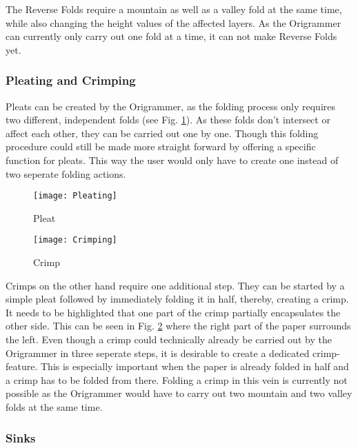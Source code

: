 \noindent The Reverse Folds require a mountain as well as a valley fold at the same time, while also changing the height values of the affected layers. As the Origrammer can currently only carry out one fold at a time, it can not make Reverse Folds yet.

\subsubsection*{Pleating and Crimping}

Pleats can be created by the Origrammer, as the folding process only requires two different, independent folds (see Fig. \ref{fig:pleating}). As these folds don't intersect or affect each other, they can be carried out one by one. Though this folding procedure could still be made more straight forward by offering a specific function for pleats. This way the user would only have to create one instead of two seperate folding actions.
\begin{figure*}[htbp]
	\centering
	\begin{subfigure}{0.49\textwidth}
		\texttt{[image: Pleating]}
		\caption{Pleat}
		\label{fig:pleating}
	\end{subfigure}
	\begin{subfigure}{0.49\textwidth}
		\texttt{[image: Crimping]}
		\caption{Crimp}
		\label{fig:crimping}
	\end{subfigure}
	\caption{Pleats and Crimps}
\end{figure*}

\noindent Crimps on the other hand require one additional step. They can be started by a simple pleat followed by immediately folding it in half, thereby, creating a crimp. It needs to be highlighted that one part of the crimp partially encapsulates the other side. This can be seen in Fig. \ref{fig:crimping} where the right part of the paper surrounds the left. Even though a crimp could technically already be carried out by the Origrammer in three seperate steps, it is desirable to create a dedicated crimp-feature. This is especially important when the paper is already folded in half and a crimp has to be folded from there. Folding a crimp in this vein is currently not possible as the Origrammer would have to carry out two mountain and two valley folds at the same time.

\subsubsection*{Sinks}

